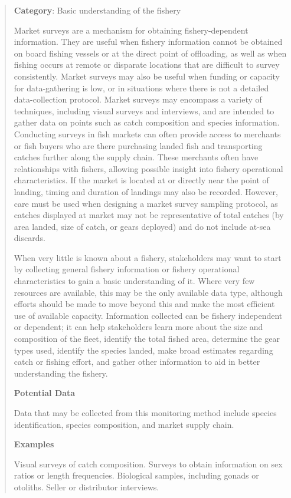 \documentclass[11pt,]{book}
\begin{document}
\begin{quote}
\textbf{Category}: Basic understanding of the fishery

Market surveys are a mechanism for obtaining fishery-dependent
information. They are useful when fishery information cannot be obtained
on board fishing vessels or at the direct point of offloading, as well
as when fishing occurs at remote or disparate locations that are
difficult to survey consistently. Market surveys may also be useful when
funding or capacity for data-gathering is low, or in situations where
there is not a detailed data-collection protocol. Market surveys may
encompass a variety of techniques, including visual surveys and
interviews, and are intended to gather data on points such as catch
composition and species information. Conducting surveys in fish markets
can often provide access to merchants or fish buyers who are there
purchasing landed fish and transporting catches further along the supply
chain. These merchants often have relationships with fishers, allowing
possible insight into fishery operational characteristics. If the market
is located at or directly near the point of landing, timing and duration
of landings may also be recorded. However, care must be used when
designing a market survey sampling protocol, as catches displayed at
market may not be representative of total catches (by area landed, size
of catch, or gears deployed) and do not include at-sea discards.

When very little is known about a fishery, stakeholders may want to
start by collecting general fishery information or fishery operational
characteristics to gain a basic understanding of it. Where very few
resources are available, this may be the only available data type,
although efforts should be made to move beyond this and make the most
efficient use of available capacity. Information collected can be
fishery independent or dependent; it can help stakeholders learn more
about the size and composition of the fleet, identify the total fished
area, determine the gear types used, identify the species landed, make
broad estimates regarding catch or fishing effort, and gather other
information to aid in better understanding the fishery.

\textbf{Potential Data}

Data that may be collected from this monitoring method include species
identification, species composition, and market supply chain.

\textbf{Examples}

Visual surveys of catch composition. Surveys to obtain information on
sex ratios or length frequencies. Biological samples, including gonads
or otoliths. Seller or distributor interviews.


\end{quote}
\end{document}
